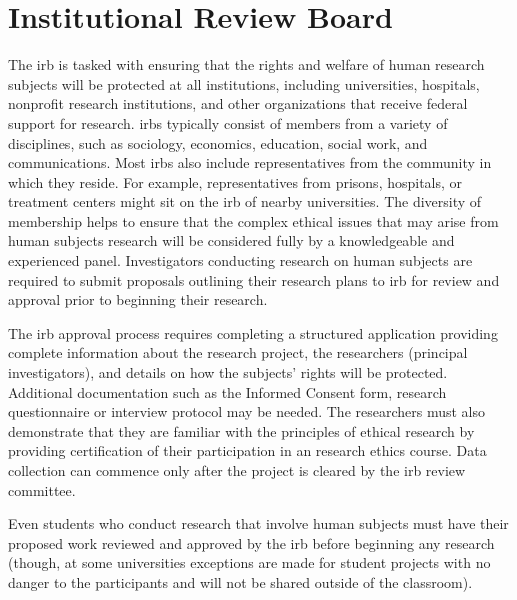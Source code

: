 \section{Institutional Review Board}

The \gls{irb} is tasked with ensuring that the rights and welfare of human research subjects will be protected at all institutions, including universities, hospitals, nonprofit research institutions, and other organizations that receive federal support for research. \glspl{irb} typically consist of members from a variety of disciplines, such as sociology, economics, education, social work, and communications. Most \glspl{irb} also include representatives from the community in which they reside. For example, representatives from prisons, hospitals, or treatment centers might sit on the \gls{irb} of nearby universities. The diversity of membership helps to ensure that the complex ethical issues that may arise from human subjects research will be considered fully by a knowledgeable and experienced panel. Investigators conducting research on human subjects are required to submit proposals outlining their research plans to \gls{irb} for review and approval prior to beginning their research. 

The \gls{irb} approval process requires completing a structured application providing complete information about the research project, the researchers (principal investigators), and details on how the subjects' rights will be protected. Additional documentation such as the Informed Consent form, research questionnaire or interview protocol may be needed. The researchers must also demonstrate that they are familiar with the principles of ethical research by providing certification of their participation in an research ethics course. Data collection can commence only after the project is cleared by the \gls{irb} review committee.

Even students who conduct research that involve human subjects must have their proposed work reviewed and approved by the \gls{irb} before beginning any research (though, at some universities exceptions are made for student projects with no danger to the participants and will not be shared outside of the classroom).

